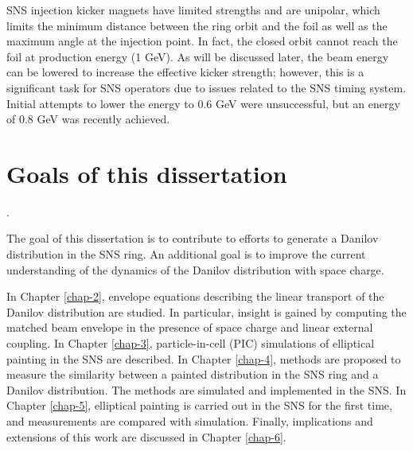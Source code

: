 SNS injection kicker magnets have limited strengths and are unipolar, which limits the minimum distance between the ring orbit and the foil as well as the maximum angle at the injection point. In fact, the closed orbit cannot reach the foil at production energy (1 GeV). As will be discussed later, the beam energy can be lowered to increase the effective kicker strength; however, this is a significant task for SNS operators due to issues related to the SNS timing system. Initial attempts to lower the energy to 0.6 GeV were unsuccessful, but an energy of 0.8 GeV was recently achieved. 



\section{Goals of this dissertation}\label{sec:Goals of this dissertation}.

The goal of this dissertation is to contribute to efforts to generate a Danilov distribution in the SNS ring. An additional goal is to improve the current understanding of the dynamics of the Danilov distribution with space charge.

In Chapter \ref{chap-2}, envelope equations describing the linear transport of the Danilov distribution are studied. In particular, insight is gained by computing the matched beam envelope in the presence of space charge and linear external coupling. In Chapter \ref{chap-3}, particle-in-cell (PIC) simulations of elliptical painting in the SNS are described. In Chapter \ref{chap-4}, methods are proposed to measure the similarity between a painted distribution in the SNS ring and a Danilov distribution. The methods are simulated and implemented in the SNS. In Chapter \ref{chap-5}, elliptical painting is carried out in the SNS for the first time, and measurements are compared with simulation. Finally, implications and extensions of this work are discussed in Chapter \ref{chap-6}.